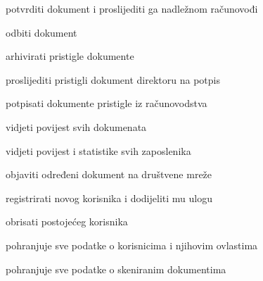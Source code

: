 \begin{packed_enum}
\begin{packed_enum}
\begin{packed_enum}
							\item potvrditi dokument i proslijediti ga nadležnom računovođi
							\item odbiti dokument

						\end{packed_enum}
					
				\end{packed_enum}

				\item  {}

				\begin{packed_enum}
					
					\item arhivirati pristigle dokumente
					\item proslijediti pristigli dokument direktoru na potpis
					
				\end{packed_enum}

				\item  {}

				\begin{packed_enum}
					
					\item potpisati dokumente pristigle iz računovodstva
					\item vidjeti povijest svih dokumenata
					\item vidjeti povijest i statistike svih zaposlenika
					\item objaviti određeni dokument na društvene mreže 
					\item registrirati novog korisnika i dodijeliti mu ulogu
					\item obrisati postojećeg korisnika
					
				\end{packed_enum}

				\item  {}

				\begin{packed_enum}

					\item pohranjuje sve podatke o korisnicima i njihovim ovlastima
					\item pohranjuje sve podatke o skeniranim dokumentima
					
				\end{packed_enum}			

			\end{packed_enum}
	
